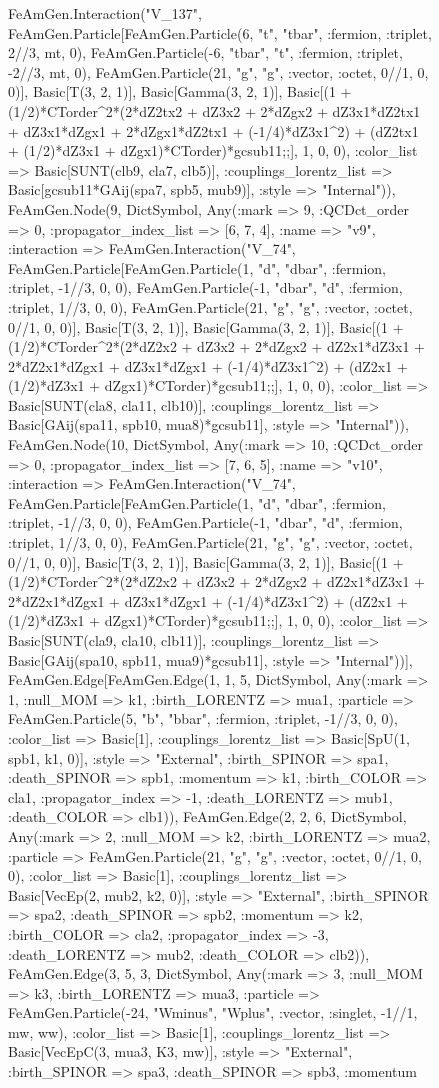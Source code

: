 \documentclass{revtex4}
\begin{document}
\begin{figure}[!htb]
\begin{center}
{FeAmGen.Interaction("V_137", FeAmGen.Particle[FeAmGen.Particle(6, "t", "tbar", :fermion, :triplet, 2//3, mt, 0), FeAmGen.Particle(-6, "tbar", "t", :fermion, :triplet, -2//3, mt, 0), FeAmGen.Particle(21, "g", "g", :vector, :octet, 0//1, 0, 0)], Basic[T(3, 2, 1)], Basic[Gamma(3, 2, 1)], Basic[(1 + (1/2)*CTorder^2*(2*dZ2tx2 + dZ3x2 + 2*dZgx2 + dZ3x1*dZ2tx1 + dZ3x1*dZgx1 + 2*dZgx1*dZ2tx1 + (-1/4)*dZ3x1^2) + (dZ2tx1 + (1/2)*dZ3x1 + dZgx1)*CTorder)*gcsub11;;], 1, 0, 0), :color_list => Basic[SUNT(clb9, cla7, clb5)], :couplings_lorentz_list => Basic[gcsub11*GAij(spa7, spb5, mub9)], :style => "Internal")), FeAmGen.Node(9, Dict{Symbol, Any}(:mark => 9, :QCDct_order => 0, :propagator_index_list => [6, 7, 4], :name => "v9", :interaction => FeAmGen.Interaction("V_74", FeAmGen.Particle[FeAmGen.Particle(1, "d", "dbar", :fermion, :triplet, -1//3, 0, 0), FeAmGen.Particle(-1, "dbar", "d", :fermion, :triplet, 1//3, 0, 0), FeAmGen.Particle(21, "g", "g", :vector, :octet, 0//1, 0, 0)], Basic[T(3, 2, 1)], Basic[Gamma(3, 2, 1)], Basic[(1 + (1/2)*CTorder^2*(2*dZ2x2 + dZ3x2 + 2*dZgx2 + dZ2x1*dZ3x1 + 2*dZ2x1*dZgx1 + dZ3x1*dZgx1 + (-1/4)*dZ3x1^2) + (dZ2x1 + (1/2)*dZ3x1 + dZgx1)*CTorder)*gcsub11;;], 1, 0, 0), :color_list => Basic[SUNT(cla8, cla11, clb10)], :couplings_lorentz_list => Basic[GAij(spa11, spb10, mua8)*gcsub11], :style => "Internal")), FeAmGen.Node(10, Dict{Symbol, Any}(:mark => 10, :QCDct_order => 0, :propagator_index_list => [7, 6, 5], :name => "v10", :interaction => FeAmGen.Interaction("V_74", FeAmGen.Particle[FeAmGen.Particle(1, "d", "dbar", :fermion, :triplet, -1//3, 0, 0), FeAmGen.Particle(-1, "dbar", "d", :fermion, :triplet, 1//3, 0, 0), FeAmGen.Particle(21, "g", "g", :vector, :octet, 0//1, 0, 0)], Basic[T(3, 2, 1)], Basic[Gamma(3, 2, 1)], Basic[(1 + (1/2)*CTorder^2*(2*dZ2x2 + dZ3x2 + 2*dZgx2 + dZ2x1*dZ3x1 + 2*dZ2x1*dZgx1 + dZ3x1*dZgx1 + (-1/4)*dZ3x1^2) + (dZ2x1 + (1/2)*dZ3x1 + dZgx1)*CTorder)*gcsub11;;], 1, 0, 0), :color_list => Basic[SUNT(cla9, cla10, clb11)], :couplings_lorentz_list => Basic[GAij(spa10, spb11, mua9)*gcsub11], :style => "Internal"))], FeAmGen.Edge[FeAmGen.Edge(1, 1, 5, Dict{Symbol, Any}(:mark => 1, :null_MOM => k1, :birth_LORENTZ => mua1, :particle => FeAmGen.Particle(5, "b", "bbar", :fermion, :triplet, -1//3, 0, 0), :color_list => Basic[1], :couplings_lorentz_list => Basic[SpU(1, spb1, k1, 0)], :style => "External", :birth_SPINOR => spa1, :death_SPINOR => spb1, :momentum => k1, :birth_COLOR => cla1, :propagator_index => -1, :death_LORENTZ => mub1, :death_COLOR => clb1)), FeAmGen.Edge(2, 2, 6, Dict{Symbol, Any}(:mark => 2, :null_MOM => k2, :birth_LORENTZ => mua2, :particle => FeAmGen.Particle(21, "g", "g", :vector, :octet, 0//1, 0, 0), :color_list => Basic[1], :couplings_lorentz_list => Basic[VecEp(2, mub2, k2, 0)], :style => "External", :birth_SPINOR => spa2, :death_SPINOR => spb2, :momentum => k2, :birth_COLOR => cla2, :propagator_index => -3, :death_LORENTZ => mub2, :death_COLOR => clb2)), FeAmGen.Edge(3, 5, 3, Dict{Symbol, Any}(:mark => 3, :null_MOM => k3, :birth_LORENTZ => mua3, :particle => FeAmGen.Particle(-24, "Wminus", "Wplus", :vector, :singlet, -1//1, mw, ww), :color_list => Basic[1], :couplings_lorentz_list => Basic[VecEpC(3, mua3, K3, mw)], :style => "External", :birth_SPINOR => spa3, :death_SPINOR => spb3, :momentum }
\end{center}
\end{figure}
\end{document}
